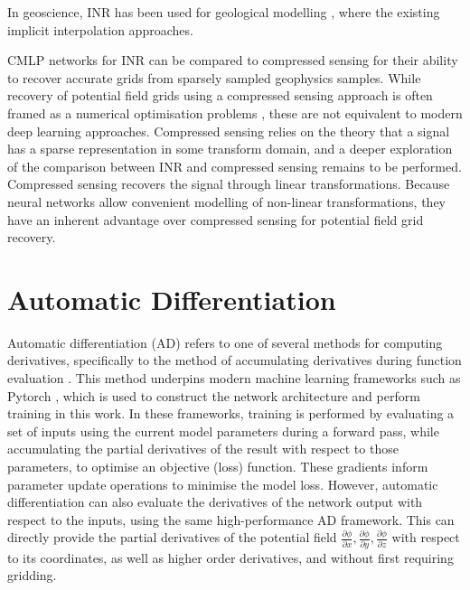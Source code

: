 \documentclass[manuscript.tex]{subfiles}
\begin{document}
In geoscience, INR has been used for geological modelling \parencite{hillierGeoINRImplicitNeural2023}, where the existing implicit interpolation approaches.

CMLP networks for INR can be compared to compressed sensing \parencite{candesIntroductionCompressiveSampling2008} for their ability to recover accurate grids from sparsely sampled geophysics samples.
While recovery of potential field grids using a compressed sensing approach is often framed as a numerical optimisation problems \parencite[e.g.][]{yangAirborneGravimetryData2015,xuGravityAnomalyReconstruction2019}, these are not equivalent to modern deep learning approaches.
Compressed sensing relies on the theory that a signal has a sparse representation in some transform domain, and a deeper exploration of the comparison between INR and compressed sensing remains to be performed.
Compressed sensing recovers the signal through linear transformations.
Because neural networks allow convenient modelling of non-linear transformations, they have an inherent advantage over compressed sensing for potential field grid recovery.

\section{Automatic Differentiation}
Automatic differentiation (AD) refers to one of several methods for computing derivatives, specifically to the method of accumulating derivatives during function evaluation \parencite{baydinAutomaticDifferentiationMachine2018}.
This method underpins modern machine learning frameworks such as Pytorch \parencite{paszkePyTorchImperativeStyle2019}, which is used to construct the network architecture and perform training in this work.
In these frameworks, training is performed by evaluating a set of inputs using the current model parameters during a forward pass, while accumulating the partial derivatives of the result with respect to those parameters, to optimise an objective (loss) function.
These gradients inform parameter update operations to minimise the model loss.
However, automatic differentiation can also evaluate the derivatives of the network output with respect to the inputs, using the same high-performance AD framework.
This can directly provide the partial derivatives of the potential field \(\frac{\partial\phi{}}{\partial x}, \frac{\partial \phi{}}{\partial y}, \frac{\partial \phi{}}{\partial z}\) with respect to its coordinates, as well as higher order derivatives, and without first requiring gridding.
\end{document}
